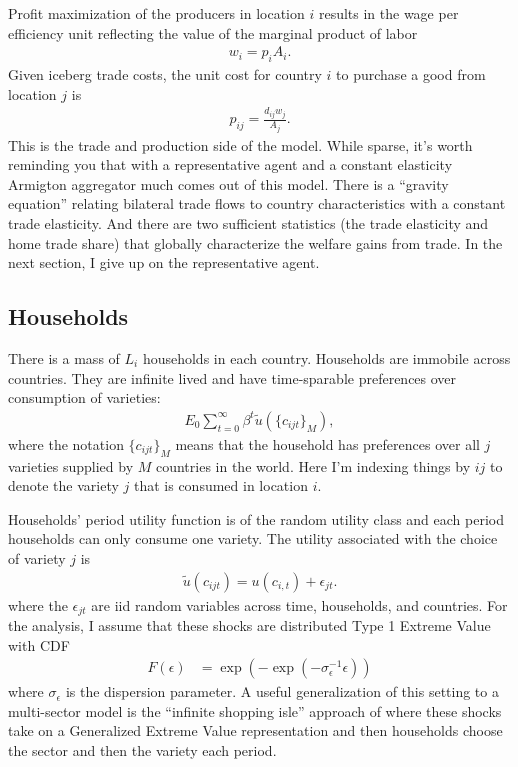 \documentclass[12pt,pdftex]{article}
\begin{document}
\begin{onehalfspacing}
Profit maximization of the producers in location $i$ results in the wage per efficiency unit reflecting the value of the marginal product of labor
\begin{align}
w_{i} = p_{i} A_{i}.
\label{eq:marginal-product}
\end{align}
Given iceberg trade costs, the unit cost for country $i$ to purchase a good from location $j$ is
\begin{align}
p_{ij} = \frac{d_{ij}w_{j}}{A_{j}}.
\label{eq:marginal-product-ship}
\end{align}
This is the trade and production side of the model. While sparse, it's worth reminding you that with a representative agent and a constant elasticity Armigton aggregator much comes out of this model. There is a ``gravity equation'' relating bilateral trade flows to country characteristics with a constant trade elasticity. And there are two sufficient statistics (the trade elasticity and home trade share) that globally characterize the welfare gains from trade. In the next section, I give up on the representative agent.

\subsection{Households}

There is a mass of $L_i$ households in each country. Households are immobile across countries. They are infinite lived and have time-sparable preferences over consumption of varieties:
\begin{align}
E_{0} \sum_{t = 0}^{\infty} \beta^{t} \tilde{u}( \{ c_{ijt} \}_{M}),
\end{align}
where the notation $\{ c_{ijt} \}_{M}$ means that the household has preferences over all $j$ varieties supplied by $M$ countries in the world. Here I'm indexing things by $ij$ to denote the variety $j$ that is consumed in location $i$.

Households' period utility function is of the random utility class and each period households can only consume one variety. The utility associated with the choice of variety $j$ is
\begin{align}
\tilde{u}( c_{ijt} ) =  u(c_{i,t}) + \epsilon_{jt}. \label{eq:utility}
\end{align}
where the $\epsilon_{jt}$ are iid random variables across time, households, and countries. For the analysis, I assume that these shocks are distributed Type 1 Extreme Value with CDF
\begin{align} 
F(\epsilon) &= \exp(-\exp(-\sigma_{\epsilon}^{-1}\epsilon))
\end{align}
where $\sigma_{\epsilon}$ is the dispersion parameter. A useful generalization of this setting to a multi-sector model is the ``infinite shopping isle'' approach of \citet{p-iq} where these shocks take on a Generalized Extreme Value representation and then households choose the sector and then the variety each period.


\end{onehalfspacing}
\end{document}

